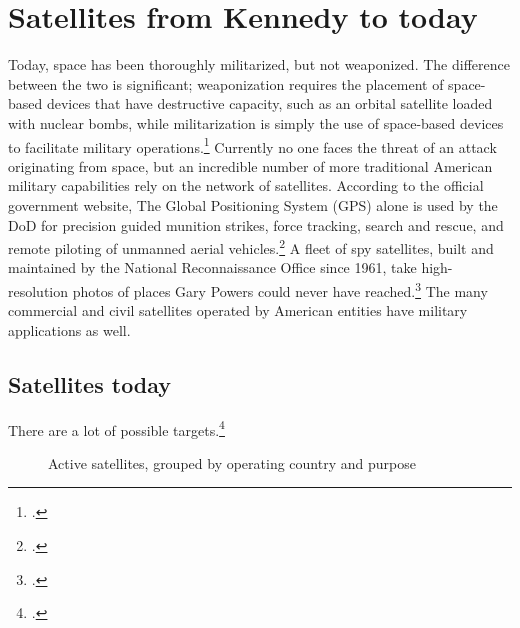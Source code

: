 \documentclass{memoir}
\begin{document}

\section{Satellites from Kennedy to today}
Today, space has been thoroughly militarized, but not weaponized. The difference between the two is significant; weaponization requires the placement of space-based devices that have destructive capacity, such as an orbital satellite loaded with nuclear bombs, while militarization is simply the use of space-based devices to facilitate military operations.\footcite[p.~3]{mowthorpe_militarization_2004} Currently no one faces the threat of an attack originating from space, but an incredible number of more traditional American military capabilities rely on the network of satellites. According to the official government website, The Global Positioning System (GPS) alone is used by the DoD for precision guided munition strikes, force tracking, search and rescue, and remote piloting of unmanned aerial vehicles.\footcite{national_coordination_office_for_space-based_positioning_navigation_and_timing_federal_2018} A fleet of spy satellites, built and maintained by the National Reconnaissance Office since 1961, take high-resolution photos of places Gary Powers could never have reached.\footcite{national_reconnaissance_office_about_2019} The many commercial and civil satellites operated by American entities have military applications as well.

\subsection{Satellites today}
There are a lot of possible targets.\footcite[A few satellites are listed as dual-purpose (i.e. Government/Military), and those are counted twice, once for each purpose. For instance, the data shows that the US is currently operating 830 satellites, while adding up the bars in this chart would give you 966. I made this choice to emphasize the dependency of various social systems on the existing satellite infrastructure.]{union_of_concerned_scientists_ucs_2018}


\begin{figure}[ht]
  \centering
  
  \label{country_sats}
  \caption{Active satellites, grouped by operating country and purpose}
\end{figure}
\end{document}
